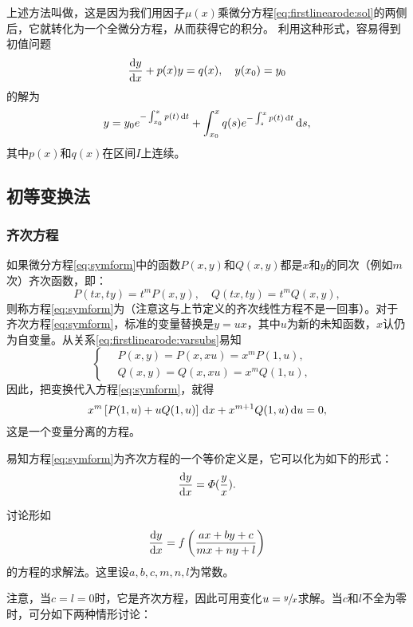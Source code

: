 上述方法叫做，这是因为我们用因子$\mu(x)$乘微分方程\eqref{eq:firstlinearode:sol}的两侧后，它就转化为一个全微分方程，从而获得它的积分。
利用这种形式，容易得到初值问题
\begin{equation}\label{eq:firstlinearode:initval}
\frac{\mathrm{d}{}y}{\mathrm{d}{}x}+p(x)y=q(x),\quad y(x_0)=y_0
\end{equation}
的解为
\begin{equation}\label{eq:firstlinearode:initval:sol}
y=y_0e^{-\int_{x_0}^xp(t)\,\mathrm{d} t}+\int_{x_0}^xq(s)e^{-\int_s^xp(t)\,\mathrm{d} t}\,\mathrm{d} s,
\end{equation}
其中$p(x)$和$q(x)$在区间$I$上连续。

\subsection{初等变换法}
\subsubsection{齐次方程}
如果微分方程\eqref{eq:symform}中的函数$P(x,y)$和$Q(x,y)$都是$x$和$y$的同次（例如$m$次）齐次函数，即：
\begin{equation}\label{eq:firstlinearode:varsubs}
P(tx,ty)=t^mP(x,y),\quad Q(tx,ty)=t^mQ(x,y),
\end{equation}
则称方程\eqref{eq:symform}为（注意这与上节定义的齐次线性方程不是一回事）。对于齐次方程\eqref{eq:symform}，标准的变量替换是$y=ux$，其中$u$为新的未知函数，$x$认仍为自变量。从关系\eqref{eq:firstlinearode:varsubs}易知
\begin{equation*}
    \begin{cases}
        \quad P(x,y)=P(x,xu)=x^mP(1,u), &\\
        \quad Q(x,y)=Q(x,xu)=x^mQ(1,u), &
    \end{cases}
\end{equation*}
因此，把变换代入方程\eqref{eq:symform}，就得
\[
x^m\left[P(1,u)+uQ(1,u)\right]\,\mathrm{d} x+x^{m+1}Q(1,u)\,\mathrm{d} u=0,
\]
这是一个变量分离的方程。

易知方程\eqref{eq:symform}为齐次方程的一个等价定义是，它可以化为如下的形式：
\[
\frac{\mathrm{d}{}y}{\mathrm{d}{}x}=\varPhi(\frac yx).
\]

\begin{example}
讨论形如\[
\frac{\mathrm{d}{}y}{\mathrm{d}{}x}=f\left(\frac{ax+by+c}{mx+ny+l}\right)
\]的方程的求解法。这里设$a,b,c,m,n,l$为常数。
\end{example}

注意，当$c=l=0$时，它是齐次方程，因此可用变化$u=\sfrac{y}{x}$求解。当$c$和$l$不全为零时，可分如下两种情形讨论：

